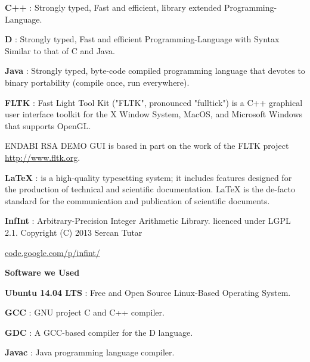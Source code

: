 \documentclass{slides}
\begin{document}
\begin{center}
\textbf{C++} : Strongly typed, Fast and efficient, library extended Programming-Language.
\end{center}
\begin{center}
\textbf{D} : Strongly typed, Fast and efficient Programming-Language with Syntax Similar to that of C and Java.
\end{center}
\begin{center}
\textbf{Java} : Strongly typed, byte-code compiled programming language that devotes to binary portability (compile once, run everywhere).
\end{center}
\begin{center}
\textbf{FLTK} : Fast Light Tool Kit ("FLTK", pronounced "fulltick") is a C++ graphical user interface toolkit for the X Window System, MacOS, and Microsoft  Windows that supports OpenGL.
\end{center}
\begin{center}
\textup{ENDABI RSA DEMO GUI} is based in  part  on  the  work  of  the  FLTK project \url{http://www.fltk.org}.
\end{center}
\newpage
\begin{center}
\textbf{LaTeX} : is a high-quality typesetting system; it includes features designed for the production of technical and scientific documentation. LaTeX is the de-facto standard for the communication and publication of scientific documents. 
\end{center}
\begin{center}
\textbf{InfInt} : Arbitrary-Precision Integer Arithmetic Library. licenced under LGPL 2.1. Copyright (C) 2013 Sercan Tutar
\end{center}
\begin{center}
\url{code.google.com/p/infint/}
\end{center}
\newpage
\begin{center}
\textbf{\Large Software we Used}
\end{center}
\begin{center}
\textbf{Ubuntu 14.04 LTS} : Free and Open Source Linux-Based Operating System.
\end{center}
\begin{center}
\textbf{GCC} : GNU project C and C++ compiler.
\end{center}
\begin{center}
 \textbf{GDC} : A GCC-based compiler for the D language.
\end{center}
\begin{center}
\textbf{Javac} : Java programming language compiler.
\end{center}
\end{document}
